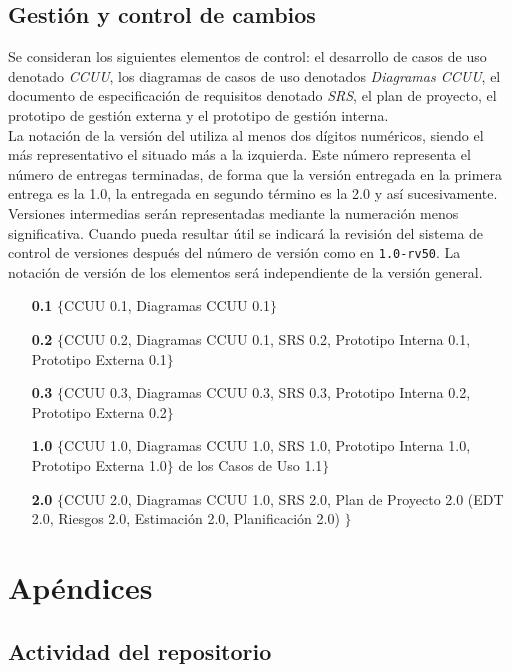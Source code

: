 \documentclass[11pt, a4paper, twoside, titlepage]{article}
\begin{document}
		\subsection{Gestión y control de cambios}
			Se consideran los siguientes elementos de control: el desarrollo de casos de uso denotado \textit{CCUU}, los diagramas de casos de uso denotados \textit{Diagramas CCUU}, el documento de especificación de requisitos \software denotado \textit{SRS}, el plan de proyecto, el prototipo de gestión externa y el prototipo de gestión interna.\\

			La notación de la versión del \software utiliza al menos dos dígitos numéricos, siendo el más representativo el situado más a la izquierda. Este número representa el número de entregas terminadas, de forma que la versión entregada en la primera entrega es la 1.0, la entregada en segundo término es la 2.0 y así sucesivamente. Versiones intermedias serán representadas mediante la numeración menos significativa. Cuando pueda resultar útil se indicará la revisión del sistema de control de versiones después del número de versión como en \verb|1.0-rv50|. La notación de versión de los elementos será independiente de la versión general.
		
		\begin{itemize}
			\item[\bfseries 0.1] $\{$CCUU 0.1, Diagramas CCUU 0.1$\}$
			\item[\bfseries 0.2] $\{$CCUU 0.2, Diagramas CCUU 0.1, SRS 0.2, Prototipo Interna 0.1, Prototipo Externa 0.1$\}$
			\item[\bfseries 0.3] $\{$CCUU 0.3, Diagramas CCUU 0.3, SRS 0.3, Prototipo Interna 0.2, Prototipo Externa 0.2$\}$
			\item[\bfseries 1.0] $\{$CCUU 1.0, Diagramas CCUU 1.0, SRS 1.0, Prototipo Interna 1.0, Prototipo Externa 1.0$\}$ de los Casos de Uso 1.1$\}$
			\item[\bfseries 2.0] $\{$CCUU 2.0, Diagramas CCUU 1.0, SRS 2.0, Plan de Proyecto 2.0 (EDT 2.0, Riesgos 2.0, Estimación 2.0, Planificación 2.0) $\}$
		\end{itemize}
		
	\newpage
	\section{Apéndices}
		\appendix
		\subsection{Actividad del repositorio}
			
		
		\newpage
		\normalsize
		\nocite{PSMAN}
		
		
\end{document}
